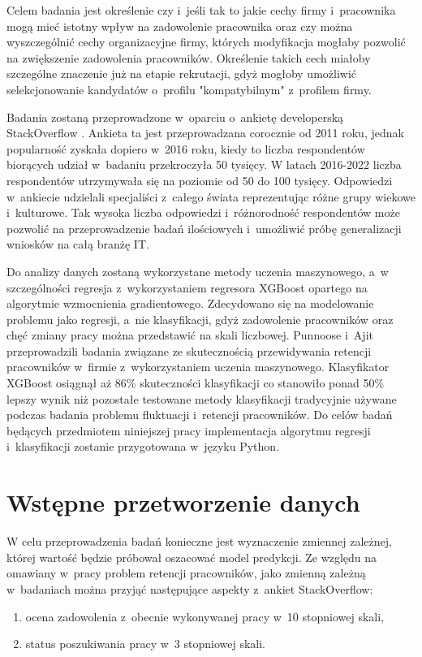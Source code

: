 Celem badania jest określenie czy i~jeśli tak to jakie cechy firmy i~pracownika mogą mieć istotny wpływ na zadowolenie pracownika
oraz czy można wyszczególnić cechy organizacyjne firmy, których modyfikacja mogłaby pozwolić na zwiększenie zadowolenia pracowników.
Określenie takich cech miałoby szczególne znaczenie już na etapie rekrutacji, gdyż mogłoby umożliwić selekcjonowanie kandydatów o~profilu "kompatybilnym" z~profilem firmy.


Badania zostaną przeprowadzone w~oparciu o~ankietę developerską StackOverflow \cite{so-survey-info}.
Ankieta ta jest przeprowadzana corocznie od 2011 roku, jednak popularność zyskała dopiero w~2016 roku, kiedy to liczba respondentów biorących udział w~badaniu przekroczyła 50 tysięcy.
W latach 2016-2022 liczba respondentów utrzymywała się na poziomie od 50 do 100 tysięcy.
Odpowiedzi w~ankiecie udzielali specjaliści z~całego świata reprezentując różne grupy wiekowe i~kulturowe.
Tak wysoka liczba odpowiedzi i~różnorodność respondentów może pozwolić na przeprowadzenie badań ilościowych i~umożliwić próbę generalizacji wniosków na całą branżę IT.


Do analizy danych zostaną wykorzystane metody uczenia maszynowego, a~w szczególności regresja z~wykorzystaniem regresora XGBoost opartego na algorytmie wzmocnienia gradientowego.
Zdecydowano się na modelowanie problemu jako regresji, a~nie klasyfikacji, gdyż zadowolenie pracowników oraz chęć zmiany pracy można przedstawić na skali liczbowej.
Punnoose i~Ajit \cite{punnoose-2016} przeprowadzili badania związane ze skutecznością przewidywania retencji pracowników w~firmie z~wykorzystaniem uczenia maszynowego.
Klasyfikator XGBoost osiągnął aż 86\% skuteczności klasyfikacji co stanowiło ponad 50\% lepszy wynik niż pozostałe testowane metody klasyfikacji tradycyjnie używane podczas badania problemu fluktuacji i~retencji pracowników.
Do celów badań będących przedmiotem niniejszej pracy implementacja algorytmu regresji i~klasyfikacji zostanie przygotowana w~języku Python.


\section{Wstępne przetworzenie danych}\label{sec:analysis:preprocessing}
W celu przeprowadzenia badań konieczne jest wyznaczenie zmiennej zależnej, której wartość będzie próbował oszacować model predykcji.
Ze względu na omawiany w~pracy problem retencji pracowników, jako zmienną zależną w~badaniach można przyjąć następujące aspekty z~ankiet StackOverflow:
\begin{enumerate}
    \item ocena zadowolenia z~obecnie wykonywanej pracy w~10 stopniowej skali,
    \item status poszukiwania pracy w~3 stopniowej skali.
\end{enumerate}

